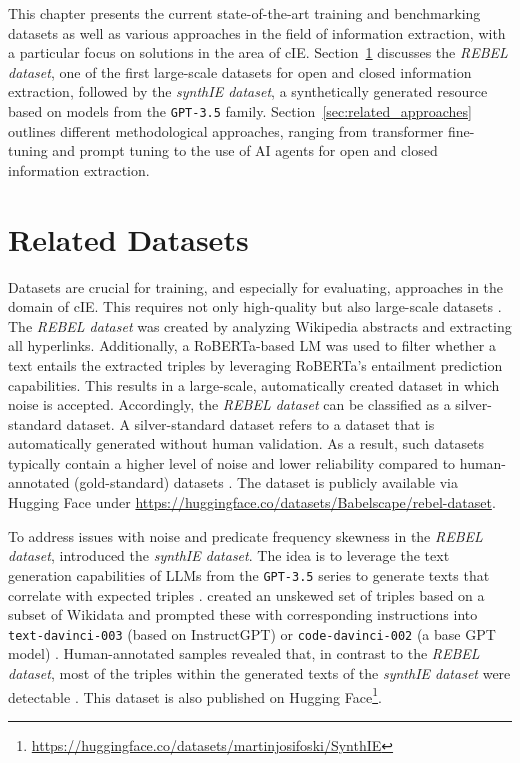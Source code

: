 \documentclass[a4paper,oneside,bibliography=totoc]{scrbook}
\begin{document}
This chapter presents the current state-of-the-art training and benchmarking datasets as well as various approaches in the field of information extraction, with a particular focus on solutions in the area of \ac{cIE}. Section~\ref{sec:related_datasets} discusses the \textit{REBEL dataset}, one of the first large-scale datasets for open and closed information extraction, followed by the \textit{synthIE dataset}, a synthetically generated resource based on models from the \texttt{GPT-3.5} family. Section~\ref{sec:related_approaches} outlines different methodological approaches, ranging from transformer fine-tuning and prompt tuning to the use of \ac{AI} agents for open and closed information extraction.

\section{Related Datasets}
\label{sec:related_datasets}

Datasets are crucial for training, and especially for evaluating, approaches in the domain of \ac{cIE}. This requires not only high-quality but also large-scale datasets \cite{Josifoski2023}. The \textit{REBEL dataset} was created by analyzing Wikipedia abstracts and extracting all hyperlinks. Additionally, a RoBERTa-based \ac{LM} was used to filter whether a text entails the extracted triples by leveraging RoBERTa’s entailment prediction capabilities. This results in a large-scale, automatically created dataset in which noise is accepted. Accordingly, the \textit{REBEL dataset} can be classified as a silver-standard dataset. A silver-standard dataset refers to a dataset that is automatically generated without human validation. As a result, such datasets typically contain a higher level of noise and lower reliability compared to human-annotated (gold-standard) datasets \cite{HuguetCabot2021}. The dataset is publicly available via Hugging Face under \url{https://huggingface.co/datasets/Babelscape/rebel-dataset}.

To address issues with noise and predicate frequency skewness in the \textit{REBEL dataset}, \citet{Josifoski2023} introduced the \textit{synthIE dataset}. The idea is to leverage the text generation capabilities of \acp{LLM} from the \texttt{GPT-3.5} series to generate texts that correlate with expected triples \cite{Josifoski2023}. \citet{Josifoski2023} created an unskewed set of triples based on a subset of Wikidata and prompted these with corresponding instructions into \texttt{text-davinci-003} (based on InstructGPT) or \texttt{code-davinci-002} (a base GPT model) \cite{Josifoski2023,OpenAI2025a}. Human-annotated samples revealed that, in contrast to the \textit{REBEL dataset}, most of the triples within the generated texts of the \textit{synthIE dataset} were detectable \cite{Josifoski2023}. This dataset is also published on Hugging Face\footnote{\url{https://huggingface.co/datasets/martinjosifoski/SynthIE}}.
\end{document}
